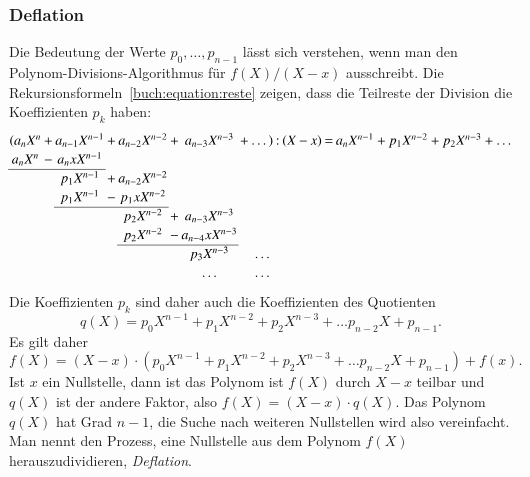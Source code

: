 \subsubsection{Deflation}
Die Bedeutung der Werte $p_0,\dots,p_{n-1}$ lässt sich verstehen, wenn
man den Polynom-Divisions-Algorithmus für $f(X) / (X-x)$ ausschreibt.
Die Rekursionsformeln~\eqref{buch:equation:reste} zeigen, dass die
Teilreste der Division die Koeffizienten $p_k$ haben:
\begin{equation}
\setcounter{MaxMatrixCols}{20}
\setlength\arraycolsep{1pt}
\renewcommand\arraystretch{1.15}
\begin{matrix}
(a_nX^n&+&a_{n-1}X^{n-1}&+&a_{n-2}X^{n-2}&+&a_{n-3}X^{n-3}&+&\dots)&:&(X&-&x)&=&a_nX^{n-1}+p_1X^{n-2}+p_2X^{n-3}+\dots\\
 a_nX^n&-&a_{n}xX^{n-1} & &              & &              & &      & &  & &  & &                \\
\cline{1-3}
       & &p_1X^{n-1}    &+&a_{n-2}X^{n-2}& &              & &      & &  & &  & &                \\
       & &p_1X^{n-1}    &-&p_1xX^{n-2}   & &              & &      & &  & &  & &                \\
\cline{3-5}
       & &              & &p_2X^{n-2}    &+&a_{n-3}X^{n-3}& &      & &  & &  & &\\
       & &              & &p_2X^{n-2}    &-&a_{n-4}xX^{n-3}&&      & &  & &  &\\
\cline{5-7}
       & &              & &              & &p_3X^{n-3}     &&\dots & &  & &  &\\
       & &              & &              & &\dots          &&\dots & &  & &  &\\
\end{matrix}
\end{equation}
Die Koeffizienten $p_k$ sind daher auch die Koeffizienten des Quotienten
\[
q(X)
=
p_0X^{n-1}+p_1X^{n-2}+p_2X^{n-3}+\dots p_{n-2}X+p_{n-1}.
\]
Es gilt daher
\[
f(X)
=
(X-x) \cdot (p_0X^{n-1}+p_1X^{n-2}+p_2X^{n-3}+\dots p_{n-2}X+p_{n-1})
+
f(x).
\]
Ist $x$ ein Nullstelle, dann ist das Polynom ist $f(X)$ durch $X-x$ teilbar
und $q(X)$ ist der andere Faktor, also $f(X)=(X-x)\cdot q(X)$.
Das Polynom $q(X)$ hat Grad $n-1$, die Suche nach weiteren Nullstellen
wird also vereinfacht. 
Man nennt den Prozess, eine Nullstelle aus dem Polynom $f(X)$
herauszudividieren, {\em Deflation}.
%

